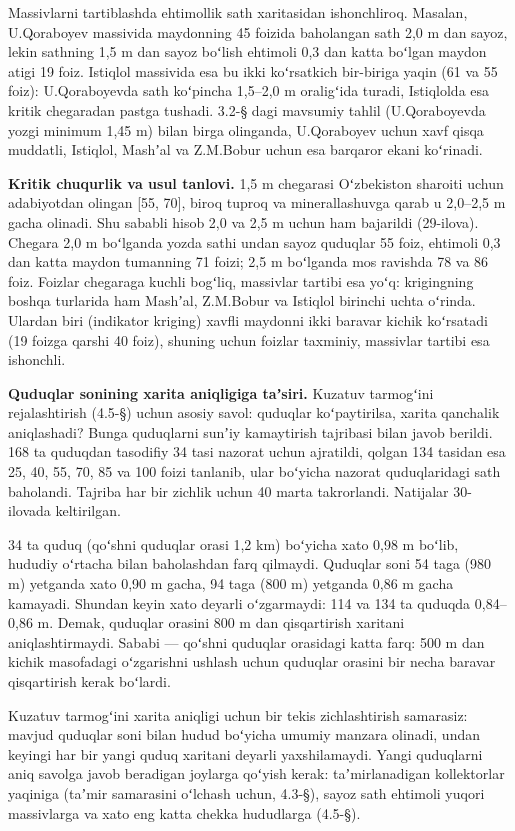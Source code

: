 \documentclass[14pt,a4paper,oneside]{extreport}
\begin{document}
Massivlarni tartiblashda ehtimollik sath xaritasidan ishonchliroq.
Masalan, U.Qoraboyev massivida maydonning 45 foizida baholangan sath 2,0
m dan sayoz, lekin sathning 1,5 m dan sayoz boʻlish ehtimoli 0,3 dan
katta boʻlgan maydon atigi 19 foiz. Istiqlol massivida esa bu ikki
koʻrsatkich bir-biriga yaqin (61 va 55 foiz): U.Qoraboyevda sath
koʻpincha 1,5--2,0 m oraligʻida turadi, Istiqlolda esa kritik chegaradan
pastga tushadi. 3.2-§ dagi mavsumiy tahlil (U.Qoraboyevda yozgi minimum
1,45 m) bilan birga olinganda, U.Qoraboyev uchun xavf qisqa muddatli,
Istiqlol, Mashʼal va Z.M.Bobur uchun esa barqaror ekani koʻrinadi.

\textbf{Kritik chuqurlik va usul tanlovi.} 1,5 m chegarasi Oʻzbekiston
sharoiti uchun adabiyotdan olingan {[}55, 70{]}, biroq tuproq va
minerallashuvga qarab u 2,0--2,5 m gacha olinadi. Shu sababli hisob 2,0
va 2,5 m uchun ham bajarildi (29-ilova). Chegara 2,0 m boʻlganda yozda
sathi undan sayoz quduqlar 55 foiz, ehtimoli 0,3 dan katta maydon
tumanning 71 foizi; 2,5 m boʻlganda mos ravishda 78 va 86 foiz. Foizlar
chegaraga kuchli bogʻliq, massivlar tartibi esa yoʻq: krigingning boshqa
turlarida ham Mashʼal, Z.M.Bobur va Istiqlol birinchi uchta oʻrinda.
Ulardan biri (indikator kriging) xavfli maydonni ikki baravar kichik
koʻrsatadi (19 foizga qarshi 40 foiz), shuning uchun foizlar taxminiy,
massivlar tartibi esa ishonchli.

\textbf{Quduqlar sonining xarita aniqligiga taʼsiri.} Kuzatuv tarmogʻini
rejalashtirish (4.5-§) uchun asosiy savol: quduqlar koʻpaytirilsa,
xarita qanchalik aniqlashadi? Bunga quduqlarni sunʼiy kamaytirish
tajribasi bilan javob berildi. 168 ta quduqdan tasodifiy 34 tasi nazorat
uchun ajratildi, qolgan 134 tasidan esa 25, 40, 55, 70, 85 va 100 foizi
tanlanib, ular boʻyicha nazorat quduqlaridagi sath baholandi. Tajriba
har bir zichlik uchun 40 marta takrorlandi. Natijalar 30-ilovada
keltirilgan.

34 ta quduq (qoʻshni quduqlar orasi 1,2 km) boʻyicha xato 0,98 m boʻlib,
hududiy oʻrtacha bilan baholashdan farq qilmaydi. Quduqlar soni 54 taga
(980 m) yetganda xato 0,90 m gacha, 94 taga (800 m) yetganda 0,86 m
gacha kamayadi. Shundan keyin xato deyarli oʻzgarmaydi: 114 va 134 ta
quduqda 0,84--0,86 m. Demak, quduqlar orasini 800 m dan qisqartirish
xaritani aniqlashtirmaydi. Sababi --- qoʻshni quduqlar orasidagi katta
farq: 500 m dan kichik masofadagi oʻzgarishni ushlash uchun quduqlar
orasini bir necha baravar qisqartirish kerak boʻlardi.

Kuzatuv tarmogʻini xarita aniqligi uchun bir tekis zichlashtirish
samarasiz: mavjud quduqlar soni bilan hudud boʻyicha umumiy manzara
olinadi, undan keyingi har bir yangi quduq xaritani deyarli
yaxshilamaydi. Yangi quduqlarni aniq savolga javob beradigan joylarga
qoʻyish kerak: taʼmirlanadigan kollektorlar yaqiniga (taʼmir samarasini
oʻlchash uchun, 4.3-§), sayoz sath ehtimoli yuqori massivlarga va xato
eng katta chekka hududlarga (4.5-§).
\end{document}
